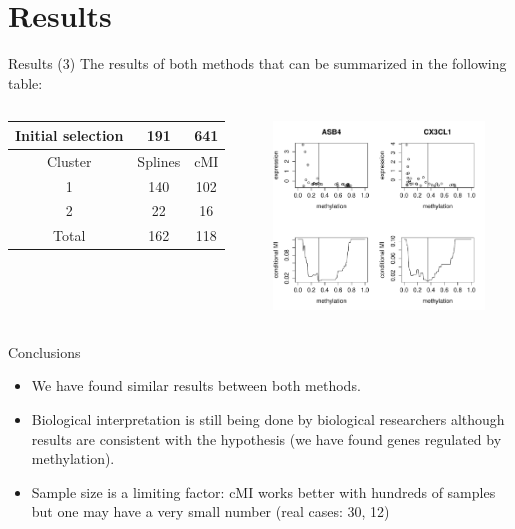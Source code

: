 \documentclass[handout]{beamer}
\begin{document}
\section{Results}




\begin{frame}{Results (3)}
The results of both methods that can be summarized in the following table:
\begin{columns}
\begin{column}{.5\linewidth}
\begin{center}
\begin{tabular}{|c|c|c|}
\hline
Initial selection & 191 & 641 \\
\hline
\hline
Cluster & Splines & cMI \\
\hline
1 & 140 & 102 \\
2 & 22 & 16 \\
\hline
Total & 162 & 118 \\
\hline 
\end{tabular}
\end{center}
\end{column}
\begin{column}{.5\linewidth}
\begin{center}
\includegraphics[height=5cm]{./images/grafic_two_genes.pdf}
\end{center}
\end{column}
\end{columns}
\end{frame}



\begin{frame}{Conclusions}
  \begin{itemize}
  \item We have found similar results between both methods.
  \item Biological interpretation is still being done by biological
    researchers although results are consistent with the hypothesis
    (we have found genes regulated by methylation).
  \item Sample size is a limiting factor: cMI works better with
    hundreds of samples but one may have a very small number (real
    cases: 30, 12)
\end{itemize}
\end{frame}
\end{document}
